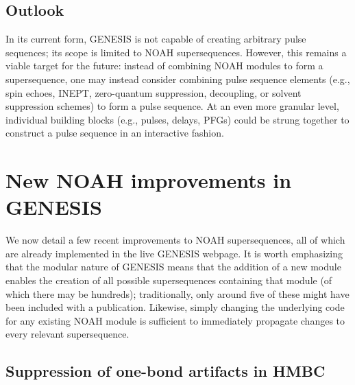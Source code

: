 \documentclass[a4paper,11pt]{article}
\begin{document}
\begin{refsection}
\subsection{Outlook}
\label{subsec:outlook}

In its current form, GENESIS is not capable of creating arbitrary pulse sequences; its scope is limited to NOAH supersequences.
However, this remains a viable target for the future: instead of combining NOAH modules to form a supersequence, one may instead consider combining pulse sequence elements (e.g., spin echoes, INEPT, zero-quantum suppression, decoupling, or solvent suppression schemes) to form a pulse sequence.
At an even more granular level, individual building blocks (e.g., pulses, delays, PFGs) could be strung together to construct a pulse sequence in an interactive fashion.


\section{New NOAH improvements in GENESIS}

We now detail a few recent improvements to NOAH supersequences, all of which are already implemented in the live GENESIS webpage.
It is worth emphasizing that the modular nature of GENESIS means that the addition of a new module enables the creation of all possible supersequences containing that module (of which there may be hundreds); traditionally, only around five of these might have been included with a publication.
Likewise, simply changing the underlying code for any existing NOAH module is sufficient to immediately propagate changes to every relevant supersequence.

\subsection{Suppression of one-bond artifacts in HMBC}


\end{refsection}
\end{document}
